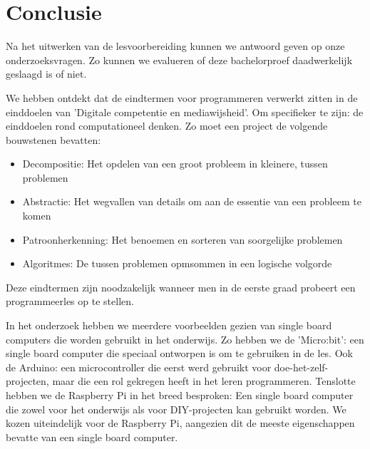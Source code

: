 
\chapter{Conclusie}
\label{ch:conclusie}


Na het uitwerken van de lesvoorbereiding kunnen we antwoord geven op onze onderzoeksvragen. Zo kunnen we evalueren of deze bachelorproef daadwerkelijk geslaagd is of niet.

We hebben ontdekt dat de eindtermen voor programmeren verwerkt zitten in de einddoelen van 'Digitale competentie en mediawijsheid'. Om specifieker te zijn: de einddoelen rond computationeel denken. Zo moet een project de volgende bouwstenen bevatten:
\begin{itemize}
    \item Decompositie: Het opdelen van een groot probleem in kleinere, tussen problemen
    \item Abstractie: Het wegvallen van details om aan de essentie van een probleem te komen
    \item Patroonherkenning: Het benoemen en sorteren van soorgelijke problemen 
    \item Algoritmes: De tussen problemen opmsommen in een logische volgorde
\end{itemize} 
Deze eindtermen zijn noodzakelijk wanneer men in de eerste graad probeert een programmeerles op te stellen.

In het onderzoek hebben we meerdere voorbeelden gezien van single board computers die worden gebruikt in het onderwijs. Zo hebben we de 'Micro:bit': een single board computer die speciaal ontworpen is om te gebruiken in de les. Ook de Arduino: een microcontroller die eerst werd gebruikt voor doe-het-zelf-projecten, maar die een rol gekregen heeft in het leren programmeren. Tenslotte hebben we de Raspberry Pi in het breed besproken: Een single board computer die zowel voor het onderwijs als voor DIY-projecten kan gebruikt worden. We kozen uiteindelijk voor de Raspberry Pi, aangezien dit de meeste eigenschappen bevatte van een single board computer.


